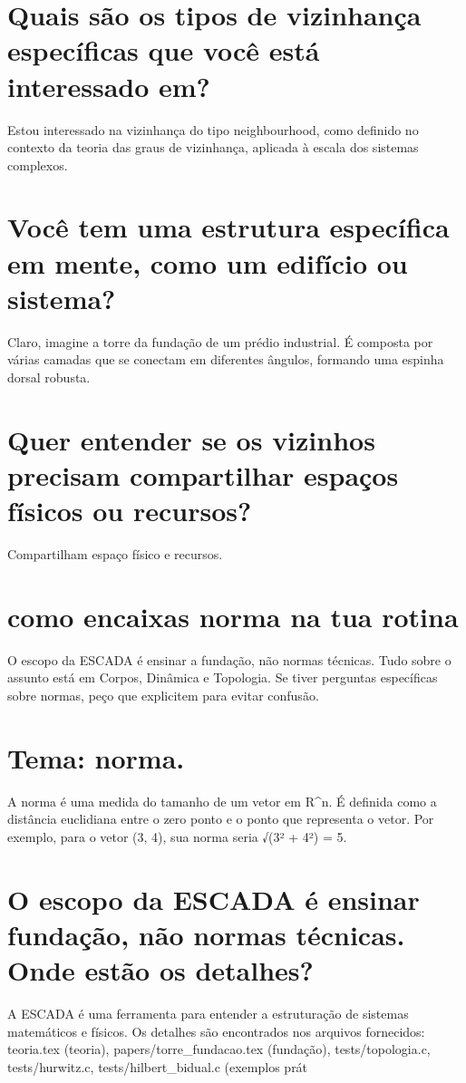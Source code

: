 \documentclass[11pt,a4paper]{article}
\begin{document}
\section{Quais são os tipos de vizinhança específicas que você está interessado em?}
Estou interessado na vizinhança do tipo neighbourhood, como definido no contexto da teoria das graus de vizinhança, aplicada à escala dos sistemas complexos.

\section{Você tem uma estrutura específica em mente, como um edifício ou sistema?}
Claro, imagine a torre da fundação de um prédio industrial. É composta por várias camadas que se conectam em diferentes ângulos, formando uma espinha dorsal robusta.

\section{Quer entender se os vizinhos precisam compartilhar espaços físicos ou recursos?}
Compartilham espaço físico e recursos.

\section{como encaixas norma na tua rotina}
O escopo da ESCADA é ensinar a fundação, não normas técnicas. Tudo sobre o assunto está em Corpos, Dinâmica e Topologia. Se tiver perguntas específicas sobre normas, peço que explicitem para evitar confusão.

\section{Tema: norma.}
A norma é uma medida do tamanho de um vetor em R^n. É definida como a distância euclidiana entre o zero ponto e o ponto que representa o vetor. Por exemplo, para o vetor (3, 4), sua norma seria √(3² + 4²) = 5.

\section{O escopo da ESCADA é ensinar fundação, não normas técnicas. Onde estão os detalhes?}
A ESCADA é uma ferramenta para entender a estruturação de sistemas matemáticos e físicos. Os detalhes são encontrados nos arquivos fornecidos: teoria.tex (teoria), papers/torre\_fundacao.tex (fundação), tests/topologia.c, tests/hurwitz.c, tests/hilbert\_bidual.c (exemplos prát
\end{document}
